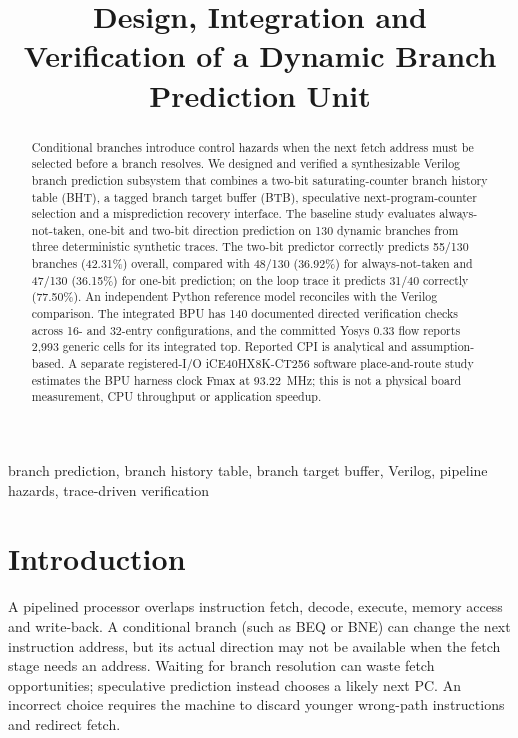 \documentclass[conference,a4paper]{IEEEtran}
\title{Design, Integration and Verification of a Dynamic Branch Prediction Unit}
\author{\IEEEauthorblockN{Shubhaang Kataruka, Tanish Yadav, Tanmay Singh, Vansh Panwar and Lakshya}
\IEEEauthorblockA{B.Tech. Computer Science and Artificial Intelligence\\
Newton School of Technology, Rishihood University\\
Sonipat, Haryana, India\\
MCA Project 5 \textbar{} Team: master-slave}}
\begin{document}
\maketitle

\begin{abstract}
Conditional branches introduce control hazards when the next fetch address must be selected before a branch resolves. We designed and verified a synthesizable Verilog branch prediction subsystem that combines a two-bit saturating-counter branch history table (BHT), a tagged branch target buffer (BTB), speculative next-program-counter selection and a misprediction recovery interface. The baseline study evaluates always-not-taken, one-bit and two-bit direction prediction on 130 dynamic branches from three deterministic synthetic traces. The two-bit predictor correctly predicts 55/130 branches (42.31\%) overall, compared with 48/130 (36.92\%) for always-not-taken and 47/130 (36.15\%) for one-bit prediction; on the loop trace it predicts 31/40 correctly (77.50\%). An independent Python reference model reconciles with the Verilog comparison. The integrated BPU has 140 documented directed verification checks across 16- and 32-entry configurations, and the committed Yosys 0.33 flow reports 2,993 generic cells for its integrated top. Reported CPI is analytical and assumption-based. A separate registered-I/O iCE40HX8K-CT256 software place-and-route study estimates the BPU harness clock Fmax at 93.22~MHz; this is not a physical board measurement, CPU throughput or application speedup.
\end{abstract}
\begin{IEEEkeywords}
branch prediction, branch history table, branch target buffer, Verilog, pipeline hazards, trace-driven verification
\end{IEEEkeywords}

\section{Introduction}
A pipelined processor overlaps instruction fetch, decode, execute, memory access and write-back. A conditional branch (such as BEQ or BNE) can change the next instruction address, but its actual direction may not be available when the fetch stage needs an address. Waiting for branch resolution can waste fetch opportunities; speculative prediction instead chooses a likely next PC. An incorrect choice requires the machine to discard younger wrong-path instructions and redirect fetch.
\end{document}

